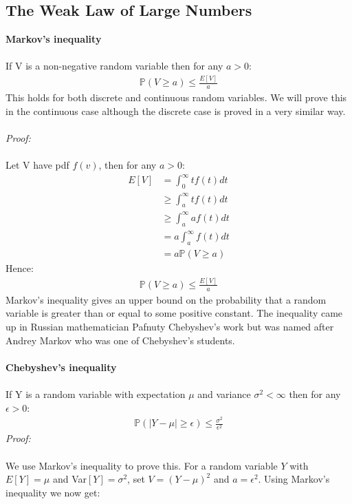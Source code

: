 \documentclass[,oneside]{article}
\begin{document}
\begin{enumerate}
\subsection{The Weak Law of Large Numbers}
\textbf{Markov's inequality}\\ \\
If V is a non-negative random variable then for any $a > 0$:
\begin{align*}
\mathbb{P}(V \geq a) \leq \frac{E[V]}{a}
\end{align*}
This holds for both discrete and continuous random variables. We will prove this in the continuous case although the discrete case is proved in a very similar way. \\ \\
\textit{Proof:}\\ \\
Let V have pdf $f(v)$, then for any $a > 0$:
\begin{align*}
E[V] &= \int_{0}^{\infty} tf(t)dt\\
& \geq \int_{a}^{\infty} tf(t)dt\\
& \geq \int_{a}^{\infty} af(t)dt\\
&= a  \int_{a}^{\infty} f(t)dt\\
&= a\mathbb{P}(V \geq a)
\end{align*}
Hence:
\begin{align*}
\mathbb{P}(V \geq a) \leq \frac{E[V]}{a}
\end{align*}
Markov's inequality gives an upper bound on the probability that a random variable is greater than or equal to some positive constant. The inequality came up in Russian mathematician Pafnuty Chebyshev's work but was named after Andrey Markov who was one of Chebyshev's students.\\ \\
\textbf{Chebyshev's inequality}\\ \\
If Y is a random variable with expectation $\mu$ and variance $\sigma^2 < \infty$ then for any $\epsilon > 0$:
\begin{align*}
\mathbb{P}(|Y-\mu| \geq \epsilon) \leq \frac{\sigma^2}{\epsilon^2}
\end{align*}
\textit{Proof:}\\ \\
We use Markov's inequality to prove this. For a random variable $Y$ with $E[Y]=\mu$ and Var$[Y]=\sigma^2$, set $V = (Y-\mu)^2$ and $a = \epsilon^2$. Using Markov's inequality we now get:
\begin{align*}

\end{align*}
\end{enumerate}
\end{document}

